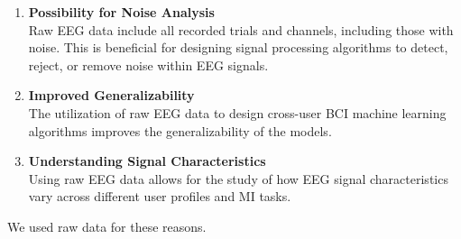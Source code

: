 \begin{enumerate}
  \item \textbf{Possibility for Noise Analysis} \\
    Raw EEG data include all recorded trials and channels, including those with noise. This is beneficial for designing signal processing algorithms to detect, reject, or remove noise within EEG signals\cite{dreyer2023large}.\\
  
  \item \textbf{Improved Generalizability} \\
    The utilization of raw EEG data to design cross-user BCI machine learning algorithms improves the generalizability of the models\cite{dreyer2023large}.\\
  
  \item \textbf{Understanding Signal Characteristics} \\
    Using raw EEG data allows for the study of how EEG signal characteristics vary across different user profiles and MI tasks\cite{dreyer2023large}.\\
\end{enumerate}
We used raw data for these reasons.